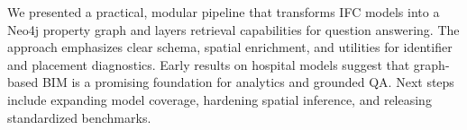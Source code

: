 We presented a practical, modular pipeline that transforms IFC models into a Neo4j property graph and layers retrieval capabilities for question answering. The approach emphasizes clear schema, spatial enrichment, and utilities for identifier and placement diagnostics. Early results on hospital models suggest that graph-based BIM is a promising foundation for analytics and grounded QA. Next steps include expanding model coverage, hardening spatial inference, and releasing standardized benchmarks.

